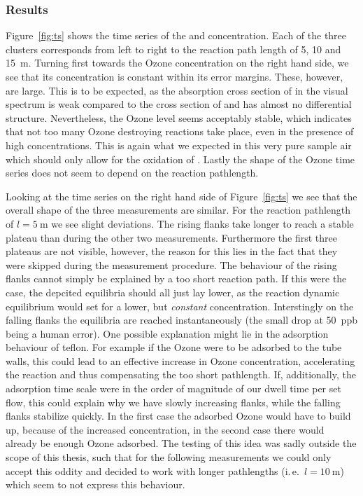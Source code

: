 \subsubsection{Results}
\label{sec:no-results}

Figure~\ref{fig:ts} shows the time series of the  and 
concentration. Each of the three clusters corresponds from left to
right to the reaction path length of \num{5}, \num{10} and
\SI{15}{\meter}. Turning first towards the Ozone concentration on the
right hand side, we see that its concentration is constant within its
error margins. These, however, are large. This is to be expected, as
the absorption cross section of  in the visual spectrum is weak
compared to the cross section of  and has almost no
differential structure. Nevertheless, the Ozone level seems
acceptably stable, which indicates that not too many Ozone destroying
reactions take place, even in the presence of high 
concentrations. This is again what we expected in this very pure
sample air which should only allow for the oxidation of
. Lastly the shape of the Ozone time series does not seem to
depend on the reaction pathlength.

Looking at the  time series on the right hand side of
Figure~\ref{fig:ts} we see that the overall shape of the three
measurements are similar. For the reaction pathlength of $l=
\SI{5}{\meter}$ we see slight deviations. The rising flanks take
longer to reach a stable plateau than during the other two
measurements. Furthermore the first three plateaus are not visible,
however, the reason for this lies in the fact that they were skipped
during the measurement procedure. The behaviour of the rising flanks
cannot simply be explained by a too short reaction path. If this were
the case, the depcited equilibria should all just lay lower, as the
reaction dynamic equilibrium would set for a lower, but
\emph{constant}  concentration. Interstingly on the falling
flanks the equilibria are reached instantaneously (the small drop at
\SI{50}{ppb} being a human error). One possible explanation might lie
in the adsorption behaviour of teflon. For example if the Ozone were
to be adsorbed to the tube walls, this could lead to an effective
increase in Ozone concentration, accelerating the reaction and thus
compensating the too short pathlength. If, additionally, the
adsorption time scale were in the order of magnitude of our dwell time
per set flow, this could explain why we have slowly increasing flanks,
while the falling flanks stabilize quickly. In the first case the
adsorbed Ozone would have to build up, because of the increased
concentration, in the second case there would already be enough Ozone
adsorbed. The testing of this idea was sadly outside the scope of this
thesis, such that for the following measurements we could only accept
this oddity and decided to work with longer pathlengths (i.\,e.~$l =
\SI{10}{\meter}$) which seem to not express this behaviour.

